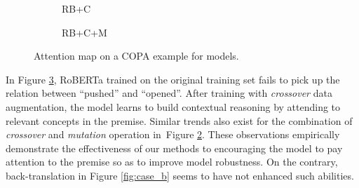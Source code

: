 \documentclass[runningheads]{llncs}
\newcommand{\figref}[1]{Figure \ref{#1}}
\newcommand{\KZ}[1]{\textcolor{blue}{Kenny: #1}}
\begin{document}
\begin{figure}[th!]
\begin{subfigure}[b]{0.40\textwidth}
\caption{RB+C}
\label{fig:case_c}
\end{subfigure}
\hfill
\begin{subfigure}[b]{0.40\textwidth}
\centering
{}
\caption{RB+C+M}
\label{fig:case_cm}
\end{subfigure}
\caption{Attention map on a COPA example for models.}
\label{fig:case}
\end{figure}


In \figref{fig:case}, 
RoBERTa trained on the original training set fails to pick up the 
relation between ``pushed'' and ``opened''. 
After training with \textit{crossover} data augmentation, 
the model learns to build contextual reasoning  
by attending to relevant concepts in the premise. 
Similar trends also exist for the combination of \textit{crossover} 
and \textit{mutation} operation in~\figref{fig:case_cm}. 
These observations empirically demonstrate the effectiveness of our methods 
to encouraging the model to pay attention to the premise so as to improve 
model robustness. On the contrary, back-translation in \figref{fig:case_b} seems 
to have not enhanced such abilities.
\end{document}
